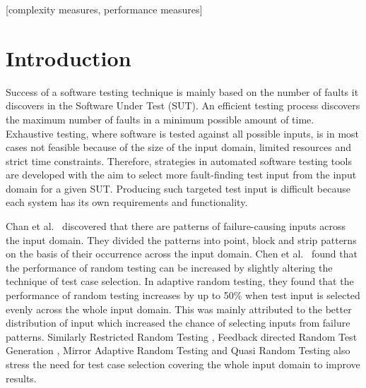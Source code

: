 \documentclass{acm_proc_article-sp}
\begin{document}
[complexity measures, performance measures]




\section{Introduction}\label{sec:intro}
Success of a software testing technique is mainly based on the number of faults it discovers in the Software Under Test (SUT). An efficient testing process discovers the maximum number of faults in a minimum possible amount of time. Exhaustive testing, where software is tested against all possible inputs, is in most cases not feasible because of the size of the input domain, limited resources and strict time constraints. Therefore, strategies in automated software testing tools are developed with the aim to select more fault-finding test input from the input domain for a given SUT. Producing such targeted test input is difficult because each system has its own requirements and functionality.

Chan et al.~\cite{Chan1996} discovered that there are patterns of failure-causing inputs across the input domain. They divided the patterns into point, block and strip patterns on the basis of their occurrence across the input domain. Chen et al.~\cite{Chen2008} found that the performance of random testing can be increased by slightly altering the technique of test case selection. In adaptive random testing, they found that the performance of random testing increases by up to 50\% when test input is selected evenly across the whole input domain. This was mainly attributed to the better distribution of input which increased the chance of selecting inputs from failure patterns. Similarly Restricted Random Testing \cite{Chan2002}, Feedback directed Random Test Generation \cite{Pacheco2007a}, Mirror Adaptive Random Testing \cite{Chen2003} and Quasi Random Testing \cite{Chen2005} also stress the need for test case selection covering the whole input domain to improve results.
\end{document}
